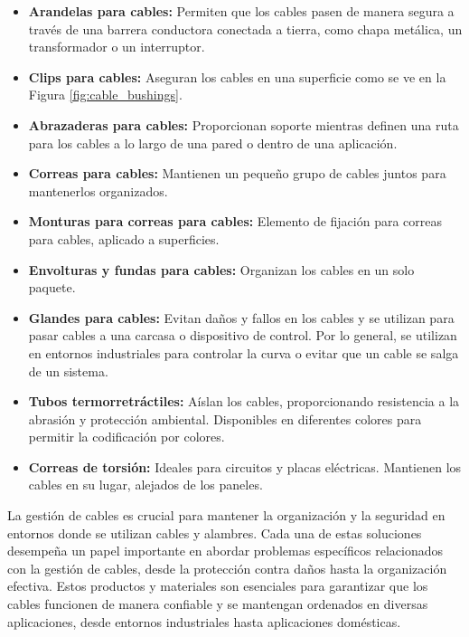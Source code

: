 \begin{enumerate}[label=\alph*)]
\begin{enumerate}[label=\Roman*)]
    \begin{itemize}
    \item \textbf{Arandelas para cables:} Permiten que los cables pasen de manera segura a través de una barrera conductora conectada a tierra, como chapa metálica, un transformador o un interruptor.
    \item \textbf{Clips para cables:} Aseguran los cables en una superficie como se ve en la Figura \ref{fig:cable_bushings}.
    \item \textbf{Abrazaderas para cables:} Proporcionan soporte mientras definen una ruta para los cables a lo largo de una pared o dentro de una aplicación.
    \item \textbf{Correas para cables:} Mantienen un pequeño grupo de cables juntos para mantenerlos organizados.
    \item \textbf{Monturas para correas para cables:} Elemento de fijación para correas para cables, aplicado a superficies.
    \item \textbf{Envolturas y fundas para cables:} Organizan los cables en un solo paquete.
    \item \textbf{Glandes para cables:} Evitan daños y fallos en los cables y se utilizan para pasar cables a una carcasa o dispositivo de control. Por lo general, se utilizan en entornos industriales para controlar la curva o evitar que un cable se salga de un sistema.
    \item \textbf{Tubos termorretráctiles:} Aíslan los cables, proporcionando resistencia a la abrasión y protección ambiental. Disponibles en diferentes colores para permitir la codificación por colores.
    \item \textbf{Correas de torsión:} Ideales para circuitos y placas eléctricas. Mantienen los cables en su lugar, alejados de los paneles.
    \end{itemize}
    
    La gestión de cables es crucial para mantener la organización y la seguridad en entornos donde se utilizan cables y alambres. Cada una de estas soluciones desempeña un papel importante en abordar problemas específicos relacionados con la gestión de cables, desde la protección contra daños hasta la organización efectiva. Estos productos y materiales son esenciales para garantizar que los cables funcionen de manera confiable y se mantengan ordenados en diversas aplicaciones, desde entornos industriales hasta aplicaciones domésticas.

    \end{enumerate}


\end{enumerate}
